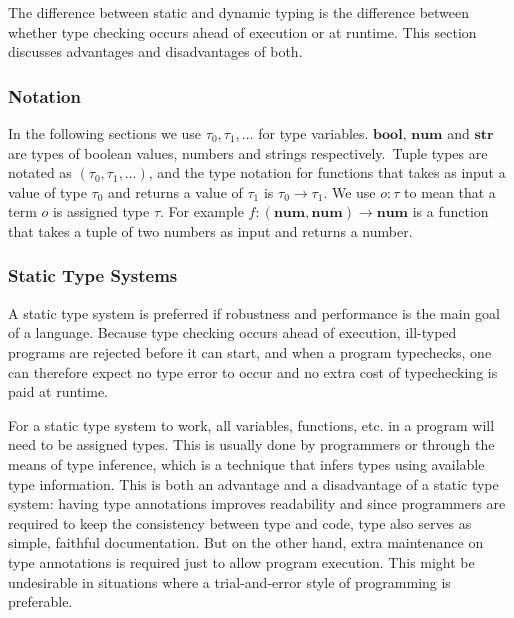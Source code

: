 The difference between static and dynamic typing is the difference
between whether type checking occurs ahead of execution or at runtime.
This section discusses advantages and disadvantages of both.

\newcommand{\tnum}{\textbf{num}}
\newcommand{\tstr}{\textbf{str}}
\newcommand{\tbool}{\textbf{bool}}
\newcommand{\tarr}[2]{#1 \rightarrow #2}

\subsubsection{Notation}
In the following sections we use $\tau_0, \tau_1, \ldots$ for type variables.
$\tbool$, $\tnum$ and $\tstr$ are types of
boolean values, numbers and strings respectively.\
Tuple types are notated as $(\tau_0, \tau_1, \ldots)$,
and the type notation for functions that takes as input a value of type $\tau_0$
and returns a value of $\tau_1$ is $\tarr{\tau_0}{\tau_1}$.
We use $o : \tau$ to mean that a term $o$ is assigned type $\tau$.
For example $f : \tarr{(\tnum, \tnum)}{\tnum}$ is a function that
takes a tuple of two numbers as input and returns a number.

\subsubsection{Static Type Systems}

A static type system is preferred if robustness and performance
is the main goal of a language.
Because type checking occurs ahead of execution,
ill-typed programs are rejected before it can start, and
when a program typechecks,
one can therefore expect no type error to occur and
no extra cost of typechecking is paid at runtime.

For a static type system to work, all variables, functions, etc. in a program
will need to be assigned types. This is usually done by programmers or through the
means of type inference, which is a technique that infers types using
available type information. This is both an advantage and a disadvantage
of a static type system: having type annotations improves readability
and since programmers are required to keep the consistency between type and code,
type also serves as simple, faithful documentation.
But on the other hand, extra maintenance on type annotations
is required just to allow program execution. This might
be undesirable in situations where a trial-and-error style of programming
is preferable.

